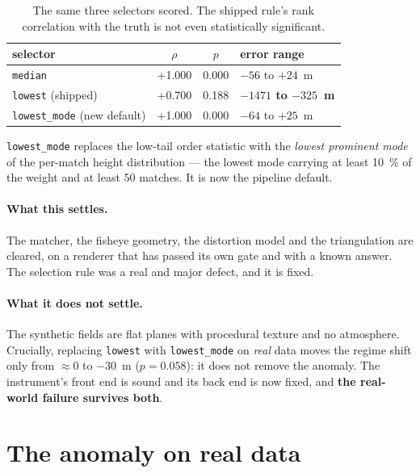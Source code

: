 \documentclass[11pt,a4paper]{article}
\newcommand{\rhoS}{\ensuremath{\rho}}
\begin{document}
\begin{table}[t]
\centering
\caption{The same three selectors scored. The shipped rule's rank correlation with the truth
is not even statistically significant.}
\label{tab:selectorscore}
\small
\begin{tabular}{@{}lS[table-format=+1.3]S[table-format=1.3]l@{}}
\toprule
selector & {$\rhoS$} & {$p$} & error range \\
\midrule
\texttt{median} & +1.000 & 0.000 & $-56$ to $+24$~\si{\metre} \\
\texttt{lowest} (shipped) & +0.700 & 0.188 & \textbf{$-1471$ to $-325$~\si{\metre}} \\
\texttt{lowest\_mode} (new default) & +1.000 & 0.000 & $-64$ to $+25$~\si{\metre} \\
\bottomrule
\end{tabular}
\end{table}

\noindent
\texttt{lowest\_mode} replaces the low-tail order statistic with the \emph{lowest prominent
mode} of the per-match height distribution --- the lowest mode carrying at least
\SI{10}{\percent} of the weight and at least 50 matches. It is now the pipeline default.

\paragraph{What this settles.} The matcher, the fisheye geometry, the distortion model and the
triangulation are cleared, on a renderer that has passed its own gate and with a known answer.
The selection rule was a real and major defect, and it is fixed.

\paragraph{What it does not settle.} The synthetic fields are flat planes with procedural
texture and no atmosphere. Crucially, replacing \texttt{lowest} with \texttt{lowest\_mode} on
\emph{real} data moves the regime shift only from $\approx$0 to \SI{-30}{\metre}
($p=0.058$): it does not remove the anomaly. The instrument's front end is sound and its back
end is now fixed, and \textbf{the real-world failure survives both}.

\section{The anomaly on real data}
\label{sec:real}
\end{document}
